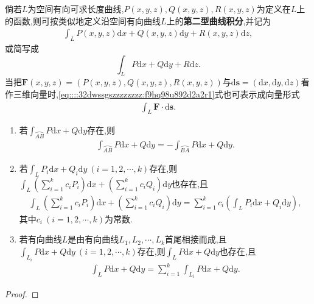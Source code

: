 \documentclass[../../main.tex]{subfiles}%
\begin{document}
\begin{definition}
倘若$L$为空间有向可求长度曲线,$P(x,y,z),Q(x,y,z),R(x,y,z)$为定义在$L$上的函数,则可按类似地定义沿空间有向曲线$L$上的\textbf{第二型曲线积分},并记为
\begin{align}
\int_L P(x,y,z)\mathrm{d}x + Q(x,y,z)\mathrm{d}y + R(x,y,z)\mathrm{d}z, \label{eq::::32dwssgszzzzzzzz:f9hq98u892d2a2r1}
\end{align}
或简写成
\[
\int_L P\mathrm{d}x + Q\mathrm{d}y + R\mathrm{d}z.
\]
当把$\boldsymbol{F}(x,y,z)=(P(x,y,z),Q(x,y,z),R(x,y,z))$与$\mathrm{d}\boldsymbol{s}=(\mathrm{d}x,\mathrm{d}y,\mathrm{d}z)$看作三维向量时,\eqref{eq::::32dwssgszzzzzzzz:f9hq98u892d2a2r1}式也可表示成向量形式
\begin{align*}
\int_L \boldsymbol{F} \cdot \mathrm{d}\boldsymbol{s}. 
\end{align*}
\end{definition}

\begin{theorem}\label{theorem:第二型曲线积分的基本性质}
\begin{enumerate}[(1)]
\item 若$\int_{\wideparen{AB}} P\mathrm{d}x + Q\mathrm{d}y$存在,则
\begin{align*}
\int_{\wideparen{AB}} P\mathrm{d}x + Q\mathrm{d}y = -\int_{\wideparen{BA}} P\mathrm{d}x + Q\mathrm{d}y. 
\end{align*}

\item 若$\int_L P_i\mathrm{d}x + Q_i\mathrm{d}y\ (i=1,2,\cdots,k)$存在,则$\int_L \left( \sum\limits_{i=1}^k c_i P_i \right)\mathrm{d}x + \left( \sum\limits_{i=1}^k c_i Q_i \right)\mathrm{d}y$也存在,且
\begin{align*}
\int_L \left( \sum_{i=1}^k c_i P_i \right)\mathrm{d}x + \left( \sum_{i=1}^k c_i Q_i \right)\mathrm{d}y = \sum_{i=1}^k c_i \left( \int_L P_i\mathrm{d}x + Q_i\mathrm{d}y \right),
\end{align*}
其中$c_i\ (i=1,2,\cdots,k)$为常数.

\item 若有向曲线$L$是由有向曲线$L_1,L_2,\cdots,L_k$首尾相接而成,且$\int_{L_i} P\mathrm{d}x + Q\mathrm{d}y\ (i=1,2,\cdots,k)$存在,则$\int_L P\mathrm{d}x + Q\mathrm{d}y$也存在,且
\begin{align*}
\int_L P\mathrm{d}x + Q\mathrm{d}y = \sum_{i=1}^k \int_{L_i} P\mathrm{d}x + Q\mathrm{d}y.
\end{align*}
\end{enumerate}
\end{theorem}
\begin{proof}

\end{proof}
\end{document}
